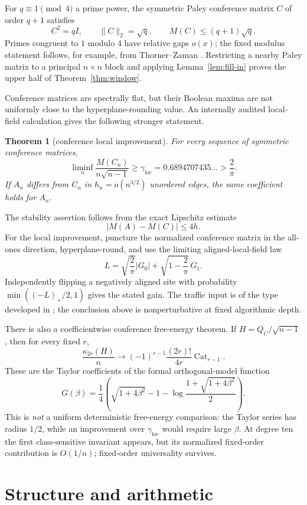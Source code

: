 \documentclass[11pt]{article}
\newtheorem{theorem}{Theorem}[section]
\theoremstyle{definition}
\theoremstyle{remark}
\begin{document}
For $q\equiv1\pmod4$ a prime power, the symmetric Paley conference matrix
$C$ of order $q+1$ satisfies
\[
 C^2=qI,
 \qquad \|C\|_2=\sqrt q,
 \qquad M(C)\le(q+1)\sqrt q.
\]
Primes congruent to $1$ modulo $4$ have relative gaps $o(x)$; the fixed
modulus statement follows, for example, from Thorner--Zaman
\cite{thorner-zaman}.  Restricting a nearby Paley matrix to a principal
$n\times n$ block and applying Lemma~\ref{lem:fill-in} proves the upper half
of Theorem~\ref{thm:window}.

Conference matrices are spectrally flat, but their Boolean maxima are not
uniformly close to the hyperplane-rounding value.  An internally audited
local-field calculation gives the following stronger statement.

\begin{theorem}[conference local improvement]\label{thm:conference-local}
For every sequence of symmetric conference matrices,
\[
 \liminf_n\frac{M(C_n)}{n\sqrt{n-1}}
 \ge \gamma_{\mathrm{loc}}
 =0.6894707435\ldots>\frac2\pi.
\]
If $A_n$ differs from $C_n$ in $h_n=o(n^{3/2})$ unordered edges, the same
coefficient holds for $A_n$.
\end{theorem}

The stability assertion follows from the exact Lipschitz estimate
\[
 |M(A)-M(C)|\le4h.
\]
For the local improvement, puncture the normalized conference matrix in the
all-ones direction, hyperplane-round, and use the limiting aligned-local-field
law
\[
 L=\sqrt{\frac2\pi}|G_0|+\sqrt{1-\frac2\pi}\,G_1.
\]
Independently flipping a negatively aligned site with probability
$\min((-L)_+/2,1)$ gives the stated gain.  The traffic input is of the type
developed in \cite{pesenti}; the conclusion above is nonperturbative at fixed
algorithmic depth.

There is also a coefficientwise conference free-energy theorem.  If
$H=Q_C/\sqrt{n-1}$, then for every fixed $r$,
\[
 \frac{\kappa_{2r}(H)}n
 \longrightarrow
 (-1)^{r-1}\frac{(2r)!}{4r}\operatorname{Cat}_{r-1}.
\]
These are the Taylor coefficients of the formal orthogonal-model function
\[
 G(\beta)=\frac14\left(
 \sqrt{1+4\beta^2}-1-
 \log\frac{1+\sqrt{1+4\beta^2}}2
 \right).
\]
This is \emph{not} a uniform deterministic free-energy comparison: the
Taylor series has radius $1/2$, while an improvement over
$\gamma_{\mathrm{loc}}$ would require large $\beta$.  At degree ten the first
class-sensitive invariant appears, but its normalized fixed-order
contribution is $O(1/n)$; fixed-order universality survives.

\section{Structure and arithmetic}
\end{document}
